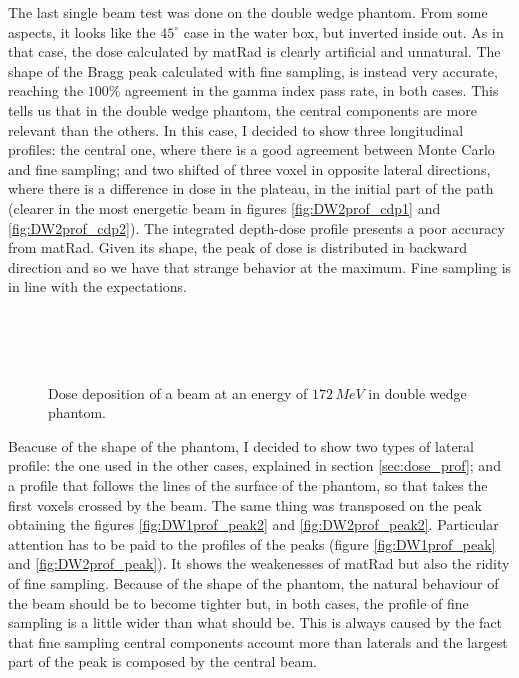 \documentclass[12pt, a4paper, twoside]{book}
\begin{document}
The last single beam test was done on the double wedge phantom. From some aspects, it looks like the $45^\circ$ case in the water box, but inverted inside out. As in that case, the dose calculated by matRad is clearly artificial and unnatural. The shape of the Bragg peak calculated with fine sampling, is instead very accurate, reaching the $100\%$ agreement in the gamma index pass rate, in both cases. 
This tells us that in the double wedge phantom, the central components are more relevant than the others.
In this case, I decided to show three longitudinal profiles: the central one, where there is a good agreement between Monte Carlo and fine sampling; and two shifted of three voxel in opposite lateral directions, where there is a difference in dose in the plateau, in the initial part of the path (clearer in the most energetic beam in figures \ref{fig:DW2prof_cdp1} and \ref{fig:DW2prof_cdp2}).
The integrated depth-dose profile presents a poor accuracy from matRad. Given its shape, the peak of dose is distributed in backward direction and so we have that strange behavior at the maximum. Fine sampling is in line with the expectations. 
\begin{figure}[!t]
\centering
{}\\ 
\\
\\
\caption{Dose deposition of a beam at an energy of $172\,MeV$ in double wedge phantom.}
\label{fig:DW2}
\end{figure}
Beacuse of the shape of the phantom, I decided to show two types of lateral profile: the one used in the other cases, explained in section \ref{sec:dose_prof}; and a profile that follows the lines of the surface of the phantom, so that takes the first voxels crossed by the beam. The same thing was transposed on the peak obtaining the figures \ref{fig:DW1prof_peak2} and \ref{fig:DW2prof_peak2}.
Particular attention has to be paid to the profiles of the peaks (figure \ref{fig:DW1prof_peak} and \ref{fig:DW2prof_peak}). It shows the weakenesses of matRad but also the ridity of fine sampling. Because of the shape of the phantom, the natural behaviour of the beam should be to become tighter but, in both cases, the profile of fine sampling is a little wider than what should be. This is always caused by the fact that fine sampling central components account more than laterals and the largest part of the peak is composed by the central beam.
\end{document}
